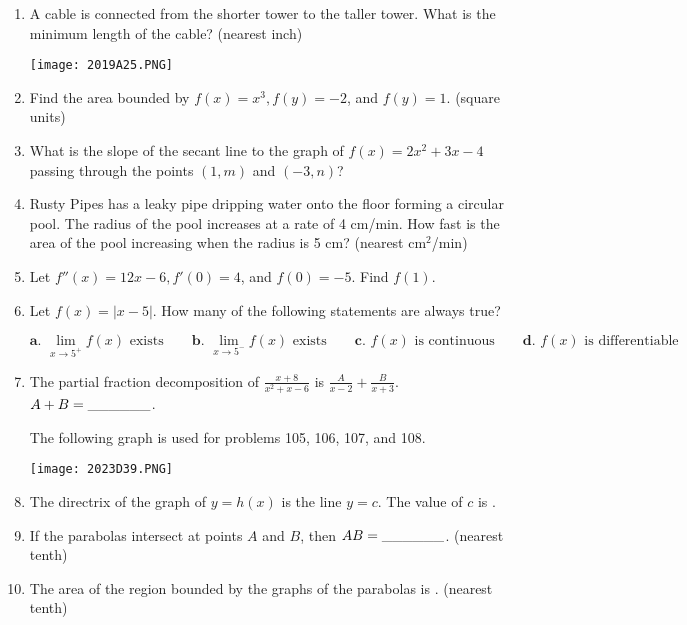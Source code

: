 \documentclass[../uilmath.tex]{subfiles}
\begin{document}
\begin{enumerate}[label=\bfseries\arabic*.]
    \item %
    A cable is connected from the shorter tower to the taller tower. What is the minimum length of the cable? (nearest inch)
    \begin{center}
        \texttt{[image: 2019A25.PNG]}
    \end{center}

    \item %
    Find the area bounded by $f(x)=x^3, f(y)=-2$, and $f(y)=1$. (square units)

    \item %
    What is the slope of the secant line to the graph of $f(x)=2x^2+3x-4$ passing through the points $(1,m)$ and $(-3,n)$?

    \item %
    Rusty Pipes has a leaky pipe dripping water onto the floor forming a circular pool. The radius of the pool increases at a rate of 4 cm/min.
    How fast is the area of the pool increasing when the radius is 5 cm? (nearest cm$^2$/min)

    \item %
    Let $f''(x)=12x-6, f'(0)=4$, and $f(0)=-5$. Find $f(1)$.

    \item %
    Let $f(x)=|x-5|$. How many of the following statements are always true?

    \[ \textbf{a. } \lim_{x\to 5^+} f(x)\text{ exists} \qquad \textbf{b. } \lim_{x\to5^-} f(x)\text{ exists}\qquad \textbf{c. } f(x) \text{ is continuous} \qquad \textbf{d. } f(x) \text{ is differentiable}\] 

    \item %
    The partial fraction decomposition of $\frac{x+8}{x^2+x-6}$ is $\frac{A}{x-2}+\frac{B}{x+3}$. $A+B=\_\_\_\_\_\_$.


    The following graph is used for problems 105, 106, 107, and 108. 
    \begin{center}
        \texttt{[image: 2023D39.PNG]}
    \end{center}
    \item %
    The directrix of the graph of $y=h(x)$ is the line $y=c$. The value of $c$ is \blank .

    \item %
    If the parabolas intersect at points $A$ and $B$, then $AB=\_\_\_\_\_\_$. (nearest tenth)

    \item %
    The area of the region bounded by the graphs of the parabolas is \blank . (nearest tenth)


\end{enumerate}
\end{document}
